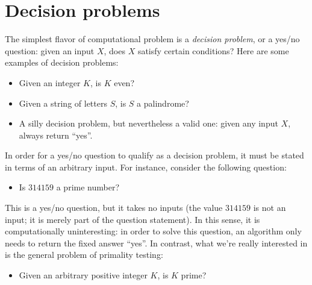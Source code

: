 



\section{Decision problems}

The simplest flavor of computational problem is a \emph{decision problem}, or a
yes/no question: given an input \(X\), does \(X\) satisfy certain conditions?
Here are some examples of decision problems:
\begin{itemize}[nosep]
  \item Given an integer \(K\), is \(K\) even?
  \item Given a string of letters \(S\), is \(S\) a palindrome?
  \item A silly decision problem, but nevertheless a valid one: given any input
    \(X\), always return ``yes''.
\end{itemize}

In order for a yes/no question to qualify as a decision problem, it must be
stated in terms of an arbitrary input.  For instance, consider the following
question:
\begin{itemize}[nosep]
  \item Is \(314159\) a prime number?
\end{itemize}
This is a yes/no question, but it takes no inputs (the value \(314159\) is not
an input; it is merely part of the question statement).  In this sense, it is
computationally uninteresting: in order to solve this question, an algorithm
only needs to return the fixed answer ``yes''.  In contrast, what we're really
interested in is the general problem of primality testing:
\begin{itemize}[nosep]
  \item Given an arbitrary positive integer \(K\), is \(K\) prime?
\end{itemize}

